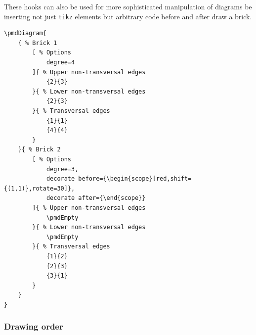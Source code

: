 \documentclass{ltxdoc}
\begin{document}
These hooks can also be used for more sophisticated manipulation of diagrams be inserting not just \texttt{tikz} elements but arbitrary code before and after draw a brick.
\begin{center}
    \begin{minipage}{\dimexpr0.85\textwidth-2\fboxrule-2\fboxsep\relax}
        \begin{minipage}[c]{0.4\linewidth}
\begin{verbatim}
\pmdDiagram{
    { % Brick 1
        [ % Options
            degree=4
        ]{ % Upper non-transversal edges
            {2}{3}
        }{ % Lower non-transversal edges
            {2}{3}
        }{ % Transversal edges
            {1}{1}
            {4}{4}
        }
    }{ % Brick 2
        [ % Options
            degree=3,
            decorate before={\begin{scope}[red,shift={(1,1)},rotate=30]},
            decorate after={\end{scope}}
        ]{ % Upper non-transversal edges
            \pmdEmpty
        }{ % Lower non-transversal edges
            \pmdEmpty
        }{ % Transversal edges
            {1}{2}
            {2}{3}
            {3}{1}
        }
    }
}
\end{verbatim}
        \end{minipage}
        \hfill
        \begin{minipage}[c]{0.4\linewidth}
        \end{minipage}
    \end{minipage}%
\end{center}
\begin{center}
\end{center}

\subsubsection{Drawing order} \label{sec: order}
\end{document}
